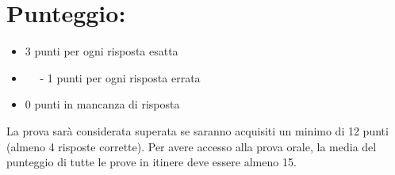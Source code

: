 \documentclass[10pt]{article}
\begin{document}
\section{Punteggio:}
\begin{itemize}
  \item 3 punti per ogni risposta esatta

  \item \(\quad\) - 1 punti per ogni risposta errata

  \item 0 punti in mancanza di risposta

\end{itemize}

La prova sarà considerata superata se saranno acquisiti un minimo di 12 punti (almeno 4 risposte corrette). Per avere accesso alla prova orale, la media del punteggio di tutte le prove in itinere deve essere almeno 15.
\end{document}
